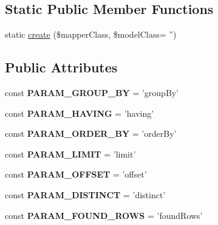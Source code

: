 \subsection*{Static Public Member Functions}
\begin{DoxyCompactItemize}
\item 
static \hyperlink{classTk_1_1Db_1_1Mapper_a026dafb9bbc50ff9fe14977b971f4dcd}{create} (\$mapper\+Class, \$model\+Class= '')
\end{DoxyCompactItemize}
\subsection*{Public Attributes}
\begin{DoxyCompactItemize}
\item 
\hypertarget{classTk_1_1Db_1_1Mapper_afb55c7a9f17dfe50dadab779a6439d2d}{const {\bfseries P\+A\+R\+A\+M\+\_\+\+G\+R\+O\+U\+P\+\_\+\+B\+Y} = 'group\+By'}\label{classTk_1_1Db_1_1Mapper_afb55c7a9f17dfe50dadab779a6439d2d}

\item 
\hypertarget{classTk_1_1Db_1_1Mapper_a8af03412c31b7d4b9a87bddbc44d2159}{const {\bfseries P\+A\+R\+A\+M\+\_\+\+H\+A\+V\+I\+N\+G} = 'having'}\label{classTk_1_1Db_1_1Mapper_a8af03412c31b7d4b9a87bddbc44d2159}

\item 
\hypertarget{classTk_1_1Db_1_1Mapper_a15e84adb304fa5b57a8516b9094a546f}{const {\bfseries P\+A\+R\+A\+M\+\_\+\+O\+R\+D\+E\+R\+\_\+\+B\+Y} = 'order\+By'}\label{classTk_1_1Db_1_1Mapper_a15e84adb304fa5b57a8516b9094a546f}

\item 
\hypertarget{classTk_1_1Db_1_1Mapper_a3e5760798b892625a6ff42ea0eaa1872}{const {\bfseries P\+A\+R\+A\+M\+\_\+\+L\+I\+M\+I\+T} = 'limit'}\label{classTk_1_1Db_1_1Mapper_a3e5760798b892625a6ff42ea0eaa1872}

\item 
\hypertarget{classTk_1_1Db_1_1Mapper_adb6d449e74f713c504de2d2bbf53a8c0}{const {\bfseries P\+A\+R\+A\+M\+\_\+\+O\+F\+F\+S\+E\+T} = 'offset'}\label{classTk_1_1Db_1_1Mapper_adb6d449e74f713c504de2d2bbf53a8c0}

\item 
\hypertarget{classTk_1_1Db_1_1Mapper_a5372ccbd4682dfd3cb6a02a9d4cafd3d}{const {\bfseries P\+A\+R\+A\+M\+\_\+\+D\+I\+S\+T\+I\+N\+C\+T} = 'distinct'}\label{classTk_1_1Db_1_1Mapper_a5372ccbd4682dfd3cb6a02a9d4cafd3d}

\item 
\hypertarget{classTk_1_1Db_1_1Mapper_a76f12e09f39b6a312f71aec320be746c}{const {\bfseries P\+A\+R\+A\+M\+\_\+\+F\+O\+U\+N\+D\+\_\+\+R\+O\+W\+S} = 'found\+Rows'}\label{classTk_1_1Db_1_1Mapper_a76f12e09f39b6a312f71aec320be746c}

\end{DoxyCompactItemize}
